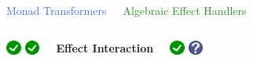 \documentclass[xcolor=pdftex,dvipsnames,table]{beamer}
\def\checkmark{\includegraphics[height=0.5cm]{checkmark}}
\def\questionmark{\includegraphics[height=0.5cm]{question_mark}}
\begin{document}
\begin{frame}
  \begin{columns}[c]
    \begin{center}
      \Large{\textcolor{RoyalBlue}{Monad Transformers}}
    \end{center}
    \begin{center}
      \Large{\textcolor{ForestGreen}{Algebraic Effect Handlers}}
    \end{center}
  \end{columns}
  \bigskip
  \bigskip
  \begin{columns}[c]
    \begin{center}
      \checkmark
      \checkmark
    \end{center}
    \begin{center}
      \textbf{Effect Interaction}
    \end{center}
    \begin{center}
      \checkmark
      \questionmark
    \end{center}
  \end{columns}
\end{frame}
\end{document}
